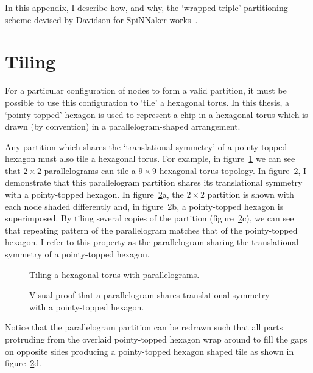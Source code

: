 	In this appendix, I describe how, and why, the `wrapped triple' partitioning
	scheme devised by Davidson for SpiNNaker works~\cite{davidsonWiring}.
	
	\section{Tiling}
		
		For a particular configuration of nodes to form a valid partition, it must
		be possible to use this configuration to `tile' a hexagonal torus. In this
		thesis, a `pointy-topped' hexagon is used to represent a chip in a
		hexagonal torus which is drawn (by convention) in a parallelogram-shaped
		arrangement.
		
		Any partition which shares the `translational symmetry' of a pointy-topped
		hexagon must also tile a hexagonal torus. For example, in
		figure~\ref{fig:tiling-a-torus} we can see that $2\times2$ parallelograms
		can tile a $9\times9$ hexagonal torus topology.  In
		figure~\ref{fig:parallelogram-tiling}, I demonstrate that this
		parallelogram partition shares its translational symmetry with a
		pointy-topped hexagon. In figure~\ref{fig:parallelogram-tiling}a, the
		$2\times2$ partition is shown with each node shaded differently and, in
		figure~\ref{fig:parallelogram-tiling}b, a pointy-topped hexagon is
		superimposed. By tiling several copies of the partition
		(figure~\ref{fig:parallelogram-tiling}c), we can see that repeating pattern
		of the parallelogram matches that of the pointy-topped hexagon. I refer to
		this property as the parallelogram sharing the translational symmetry of a
		pointy-topped hexagon.
		
		\begin{figure}
			\center
			
			\caption{Tiling a hexagonal torus with parallelograms.}
			\label{fig:tiling-a-torus}
		\end{figure}
		
		\begin{figure}
			\center
			
			\caption[A parallelogram tiles a hexagonal torus.]%
			{Visual proof that a parallelogram shares translational symmetry
			with a pointy-topped hexagon.}
			\label{fig:parallelogram-tiling}
		\end{figure}
		
		Notice that the parallelogram partition can be redrawn such that all parts
		protruding from the overlaid pointy-topped hexagon wrap around to fill the
		gaps on opposite sides producing a pointy-topped hexagon shaped tile as
		shown in figure~\ref{fig:parallelogram-tiling}d.
		
